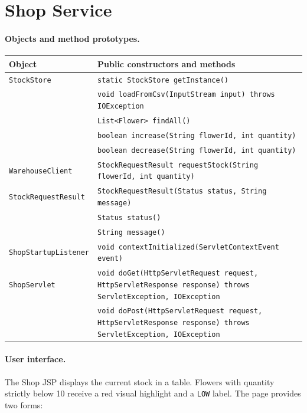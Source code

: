 \documentclass[12pt,a4paper]{article}
\begin{document}
\section{Shop Service}

\paragraph{Objects and method prototypes.}

\begin{longtable}{p{}p{}}
\toprule
\textbf{Object} & \textbf{Public constructors and methods}\\
\midrule
\endhead
\texttt{StockStore} &
\texttt{static StockStore getInstance()}\\
& \texttt{void loadFromCsv(InputStream input) throws IOException}\\
& \texttt{List<Flower> findAll()}\\
& \texttt{boolean increase(String flowerId, int quantity)}\\
& \texttt{boolean decrease(String flowerId, int quantity)}\\[2pt]
\texttt{WarehouseClient} &
\texttt{StockRequestResult requestStock(String flowerId, int quantity)}\\[2pt]
\texttt{StockRequestResult} &
\texttt{StockRequestResult(Status status, String message)}\\
& \texttt{Status status()}\\
& \texttt{String message()}\\[2pt]
\texttt{ShopStartupListener} &
\texttt{void contextInitialized(ServletContextEvent event)}\\[2pt]
\texttt{ShopServlet} &
\texttt{void doGet(HttpServletRequest request, HttpServletResponse response)
throws ServletException, IOException}\\
& \texttt{void doPost(HttpServletRequest request, HttpServletResponse response)
throws ServletException, IOException}\\
\bottomrule
\end{longtable}

\paragraph{User interface.}

The Shop JSP displays the current stock in a table. Flowers with quantity
strictly below 10 receive a red visual highlight and a \texttt{LOW} label.
The page provides two forms:
\end{document}
